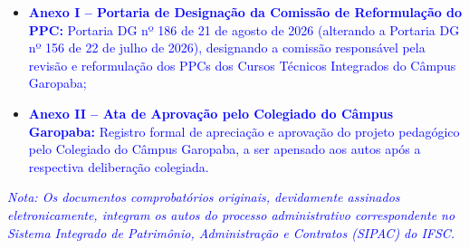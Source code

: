 \documentclass{../../modelos/latex-shared/ifsc-ppc}
\newcommand{\revisao}[1]{\textcolor{blue}{#1}}
\newcommand{\revisao}[1]{#1}
\begin{document}
\begin{itemize}
    \item \revisao{\textbf{Anexo I -- Portaria de Designação da Comissão de Reformulação do PPC:} Portaria DG nº 186 de 21 de agosto de 2026 (alterando a Portaria DG nº 156 de 22 de julho de 2026), designando a comissão responsável pela revisão e reformulação dos PPCs dos Cursos Técnicos Integrados do Câmpus Garopaba;}
    \item \revisao{\textbf{Anexo II -- Ata de Aprovação pelo Colegiado do Câmpus Garopaba:} Registro formal de apreciação e aprovação do projeto pedagógico pelo Colegiado do Câmpus Garopaba, a ser apensado aos autos após a respectiva deliberação colegiada.}
\end{itemize}

\vspace{0.5cm}
\noindent\revisao{\small\textit{Nota: Os documentos comprobatórios originais, devidamente assinados eletronicamente, integram os autos do processo administrativo correspondente no Sistema Integrado de Patrimônio, Administração e Contratos (SIPAC) do IFSC.}}
\end{document}
